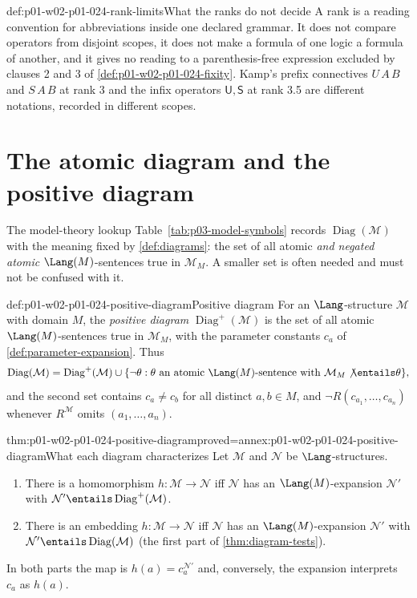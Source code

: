 \begin{hbwarning}{def:p01-w02-p01-024-rank-limits}{What the ranks do not decide}
A rank is a reading convention for abbreviations inside one declared
grammar.  It does not compare operators from disjoint scopes, it does not
make a formula of one logic a formula of another, and it gives no reading
to a parenthesis-free expression excluded by clauses 2 and 3 of
\cref{def:p01-w02-p01-024-fixity}.  Kamp's prefix connectives \(U\,A\,B\)
and \(S\,A\,B\) at rank 3 and the infix operators
\(\mathsf U,\mathsf S\) at rank 3.5 are different notations, recorded in
different scopes.
\end{hbwarning}

\section{The atomic diagram and the positive diagram}
\label{sec:p01-w02-p01-024-diagrams}

The model-theory lookup Table~\ref{tab:p03-model-symbols} records
\(\operatorname{Diag}(\mathcal M)\) with the meaning fixed by
\cref{def:diagrams}: the set of all atomic \emph{and negated atomic}
\(\Lang(M)\)-sentences true in \(\mathcal M_M\).  A smaller set is often
needed and must not be confused with it.

\begin{hbdefinition}{def:p01-w02-p01-024-positive-diagram}{Positive diagram}
For an \(\Lang\)-structure \(\mathcal M\) with domain \(M\), the
\emph{positive diagram} \(\operatorname{Diag}^+(\mathcal M)\) is the set of
all atomic \(\Lang(M)\)-sentences true in \(\mathcal M_M\), with the
parameter constants \(c_a\) of \cref{def:parameter-expansion}.  Thus
\[
  \operatorname{Diag}(\mathcal M)=\operatorname{Diag}^+(\mathcal M)\cup
  \{\neg\theta:\theta\text{ an atomic }\Lang(M)\text{-sentence with }
  \mathcal M_M\not\entails\theta\},
\]
and the second set contains \(c_a\neq c_b\) for all distinct
\(a,b\in M\), and \(\neg R(c_{a_1},\ldots,c_{a_n})\) whenever
\(R^{\mathcal M}\) omits \((a_1,\ldots,a_n)\).
\end{hbdefinition}

\begin{hbtheorem}{thm:p01-w02-p01-024-positive-diagram}{proved=annex:p01-w02-p01-024-positive-diagram}{What each diagram characterizes}
Let \(\mathcal M\) and \(\mathcal N\) be \(\Lang\)-structures.
\begin{enumerate}
\item There is a homomorphism \(h:\mathcal M\to\mathcal N\) iff
  \(\mathcal N\) has an \(\Lang(M)\)-expansion \(\mathcal N'\) with
  \(\mathcal N'\entails\operatorname{Diag}^+(\mathcal M)\).
\item There is an embedding \(h:\mathcal M\to\mathcal N\) iff
  \(\mathcal N\) has an \(\Lang(M)\)-expansion \(\mathcal N'\) with
  \(\mathcal N'\entails\operatorname{Diag}(\mathcal M)\)
  (the first part of \cref{thm:diagram-tests}).
\end{enumerate}
In both parts the map is \(h(a)=c_a^{\mathcal N'}\) and, conversely, the
expansion interprets \(c_a\) as \(h(a)\).
\end{hbtheorem}

